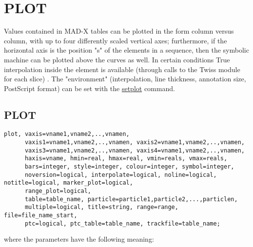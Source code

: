 
\chapter{PLOT}


Values contained in MAD-X tables can be plotted in the form column
versus column, with up to four differently scaled vertical axes;
furthermore, if the horizontal axis is the position "s" of the elements
in a sequence, then the symbolic machine can be plotted above the curves
as well. In certain conditions True interpolation inside the element is
available (through calls to the Twiss module for each slice) .  The
"environment" (interpolation, line thickness, annotation size,
PostScript format) can be set with the \hyperlink{setplot}{setplot}
command.   


\section{PLOT}	
\begin{verbatim}
plot, vaxis=vname1,vname2,..,vnamen,
      vaxis1=vname1,vname2,..,vnamen, vaxis2=vname1,vname2,..,vnamen,
      vaxis3=vname1,vname2,..,vnamen, vaxis4=vname1,vname2,..,vnamen,
      haxis=vname, hmin=real, hmax=real, vmin=reals, vmax=reals, 
      bars=integer, style=integer, colour=integer, symbol=integer, 
      noversion=logical, interpolate=logical, noline=logical, notitle=logical, marker_plot=logical, 
      range_plot=logical, 
      table=table_name, particle=particle1,particle2,...,particlen,
      multiple=logical, title=string, range=range, file=file_name_start, 
      ptc=logical, ptc_table=table_name, trackfile=table_name; 
\end{verbatim} 
where the parameters have the following meaning: 

